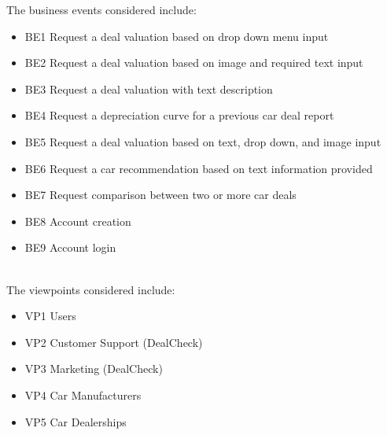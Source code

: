 \documentclass[]{article}
\begin{document}
\noindent The business events considered include:

\begin{itemize}
	\item BE1 Request a deal valuation based on drop down menu input
	\item BE2 Request a deal valuation based on image and required text input
	\item BE3 Request a deal valuation with text description
	\item BE4 Request a depreciation curve for a previous car deal report
	\item BE5 Request a deal valuation based on text, drop down, and image input
	\item BE6 Request a car recommendation based on text information provided
	\item BE7 Request comparison between two or more car deals
	\item BE8 Account creation
	\item BE9 Account login
\end{itemize}

 \\

\noindent The viewpoints considered include:

\begin{itemize}
	\item VP1 Users
	\item VP2 Customer Support (DealCheck)
	\item VP3 Marketing (DealCheck)
	\item VP4 Car Manufacturers
	\item VP5 Car Dealerships
\end{itemize}
\end{document}
